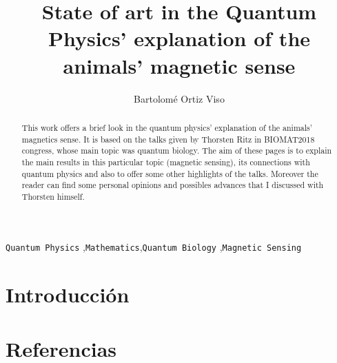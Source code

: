 \documentclass[1p]{elsarticle}
\begin{document}
\begin{frontmatter}

\title{State of art in the Quantum Physics' explanation of the animals' magnetic sense }

\author{Bartolomé Ortiz Viso}
\address{Master en Física y Matemáticas\\ Universidad de Granada\\23/06/2018}

\begin{abstract}
This work offers a brief look in the quantum physics' explanation of the animals' magnetics sense. It is based on the talks given by Thorsten Ritz in BIOMAT2018 congress, whose main topic was quantum biology. The aim of these pages is to explain the main results in this particular topic (magnetic sensing), its connections with quantum physics and also to offer some other highlights of the talks. Moreover the reader can find some personal opinions and possibles advances that I discussed with Thorsten himself. 
\end{abstract}

\begin{keyword}
 \texttt{Quantum Physics} \sep \texttt{Mathematics}\sep \texttt{Quantum Biology} \sep \texttt{Magnetic Sensing}
\end{keyword}

\end{frontmatter}
\setlength\parindent{0pt}
\linenumbers

\section{Introducción}


\section*{Referencias}


\begin{appendices}
	

\end{appendices}
\end{document}
